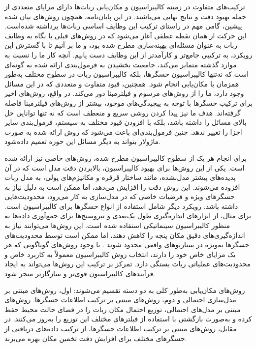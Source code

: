 ترکیب‌های متفاوت در زمینه کالیبراسیون و مکان‌یابی ربات‌ها دارای مزایای متعددی از جمله بهبود دقت و نتایج نهایی می‌باشند. در این پایان‌نامه، همچون روش‌های بیان شده پیشین، گامی مهم در راستای ترکیب این وظایف اساسی ربات‌ها برداشته‌ شده‌است. این حرکت از همان نقطه عطفی آغاز می‌شود که در روش‌های قبلی با نگاه به وظایف ربات به عنوان مسئله‌ای بهینه‌سازی مطرح شده بود، و ما بر آنیم تا با گسترش این رویکرد، به ترکیبی جامع‌تر و کارآمدتر از این وظایف دست یابیم. آنچه کار ما را نسبت به موارد گذشته متمایز می‌کند، جامعیت بخشیدن به فرمول‌بندی ارائه شده به گونه‌ای است که نه‌تنها کالیبراسیون حسگرها، بلکه کالیبراسیون ربات در سطوح مختلف به‌طور همزمان با مکان‌یابی انجام شود. همچنین، قیود متفاوت و متعددی که در این مسائل وجود دارد، ما را از روش‌های مرسوم و فیلترمبنا دور می‌کند. در واقع، روش‌های اخیر برای ترکیب حسگرها با توجه به پیچیدگی‌های موجود، بیشتر از روش‌های فیلترمبنا فاصله گرفته‌اند. هدف ما نیز پیدا کردن روشی سریع و منعطف است که نه تنها توانایی حل بالای مسائل را داشته باشد، بلکه با افزودن قیود مختلف به سیستم، فرمول‌بندی سایر اجزا را تغییر ندهد. چنین فرمول‌بندی‌ای باعث می‌شود که روش ارائه شده به صورت ماژولار بتواند به دیگر مسائل این حوزه تعمیم داده‌شود. 

برای انجام هر یک از سطوح کالیبراسیون مطرح شده، روش‌های خاصی نیز ارائه شده است. یکی از این روش‌ها برای بهبود کالیبراسیون، بالابردن دقت مدل است که در آن پدیده‌های پیشتر مدل‌نشده، مانند ساختار قرقره و مکانیزم‌های پولی، به مدل ربات افزوده می‌شوند. این روش دقت را افزایش می‌دهد، اما ممکن است به دلیل نیاز به حسگرهای ویژه و فرضیات خاصی که در مدل‌سازی به کار می‌رود، محدودیت‌هایی داشته باشد. رویکرد دیگر شامل استفاده از انواع حسگرها برای کالیبراسیون است. برای مثال، از ابزارهای اندازه‌گیری طول یک‌بعدی و نیرو‌سنج‌ها برای جمع‌آوری داده‌ها به منظور کالیبراسیون سینماتیکی استفاده شده است. این روش‌ها می‌توانند نیاز به اندازه‌گیری‌های دقیق مکان پنجه را کاهش دهند، اما ممکن است توسط محدودیت‌های حسگرها به‌ویژه در سناریوهای واقعی محدود شوند
\cite{elatta2004overview, roth1987overview}. 
با وجود روش‌های گوناگونی که هر یک مزایای خاص خود را دارند، انتخاب روش کالیبراسیون معمولاً به کاربرد خاص و محدودیت‌های عملیاتی ربات بستگی دارد. تمرکز بر ترکیب این روش‌ها می‌تواند به ایجاد فرآیندهای کالیبراسیون قوی‌تر و سازگارتر منجر شود.

روش‌های مکان‌یابی به‌طور کلی به دو دسته تقسیم می‌شوند: اول، روش‌های مبتنی بر مدل‌سازی احتمالی و دوم، روش‌های مبتنی بر ترکیب اطلاعات حسگرها. روش‌های مبتنی بر مدل‌های احتمالی، توزیع احتمال مکان ربات را در فضای حالت محیط حفظ کرده و به‌صورت بازگشتی با استفاده از فیلترهای مختلف این توزیع را به‌روز می‌کنند. در مقابل، روش‌های مبتنی بر ترکیب اطلاعات حسگرها، از ترکیب داده‌های دریافتی از حسگرهای مختلف برای افزایش دقت تخمین مکان بهره می‌برند.

